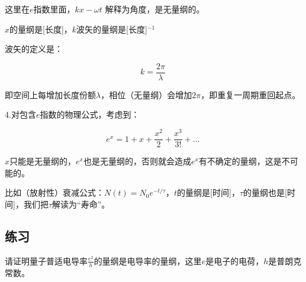 这里在$e$指数里面，$kx - \omega t$ 解释为角度，是无量纲的。

$x$的量纲是[长度]，$k$波矢的量纲是[长度]$^{-1}$

波矢的定义是：

\begin{equation}
k = \frac{2 \pi}{ \lambda}~
\end{equation}

即空间上每增加长度份额$\lambda$，相位（无量纲）会增加$2 \pi$，即重复一周期重回起点。

4.对包含$e$指数的物理公式，考虑到：

\begin{equation}
e^x = 1 + x + \frac{x^2}{2} + \frac{x^3}{3!} +\text{…}~
\end{equation}

$x$只能是无量纲的，$e^x$也是无量纲的，否则就会造成$e^x$有不确定的量纲，这是不可能的。

比如（放射性）衰减公式：$N(t) = N_0 e^{- t / \tau}$，$t$的量纲是[时间]，$\tau$的量纲也是[时间]，我们把$\tau$解读为“寿命”。

\subsection*{练习}

请证明量子普适电导率$\frac{e^2}{h}$的量纲是电导率的量纲，这里$e$是电子的电荷，$h$是普朗克常数。

